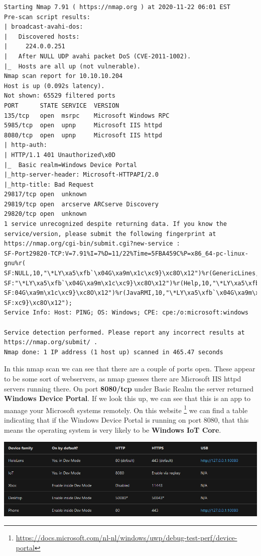\documentclass[../main.tex]{subfiles}
\begin{document}
\begin{lstlisting}
Starting Nmap 7.91 ( https://nmap.org ) at 2020-11-22 06:01 EST
Pre-scan script results:
| broadcast-avahi-dos: 
|   Discovered hosts:
|     224.0.0.251
|   After NULL UDP avahi packet DoS (CVE-2011-1002).
|_  Hosts are all up (not vulnerable).
Nmap scan report for 10.10.10.204
Host is up (0.092s latency).
Not shown: 65529 filtered ports
PORT      STATE SERVICE  VERSION
135/tcp   open  msrpc    Microsoft Windows RPC
5985/tcp  open  upnp     Microsoft IIS httpd
8080/tcp  open  upnp     Microsoft IIS httpd
| http-auth: 
| HTTP/1.1 401 Unauthorized\x0D
|_  Basic realm=Windows Device Portal
|_http-server-header: Microsoft-HTTPAPI/2.0
|_http-title: Bad Request
29817/tcp open  unknown
29819/tcp open  arcserve ARCserve Discovery
29820/tcp open  unknown
1 service unrecognized despite returning data. If you know the
service/version, please submit the following fingerprint at 
https://nmap.org/cgi-bin/submit.cgi?new-service :
SF-Port29820-TCP:V=7.91%I=7%D=11/22%Time=5FBA459C%P=x86_64-pc-linux-gnu%r(
SF:NULL,10,"\*LY\xa5\xfb`\x04G\xa9m\x1c\xc9}\xc8O\x12")%r(GenericLines,10,
SF:"\*LY\xa5\xfb`\x04G\xa9m\x1c\xc9}\xc8O\x12")%r(Help,10,"\*LY\xa5\xfb`\x
SF:04G\xa9m\x1c\xc9}\xc8O\x12")%r(JavaRMI,10,"\*LY\xa5\xfb`\x04G\xa9m\x1c\
SF:xc9}\xc8O\x12");
Service Info: Host: PING; OS: Windows; CPE: cpe:/o:microsoft:windows

Service detection performed. Please report any incorrect results at
https://nmap.org/submit/ .
Nmap done: 1 IP address (1 host up) scanned in 465.47 seconds
\end{lstlisting}

In this nmap scan we can see that there are a couple of ports open. These appear to be some sort of webservers, as nmap guesses there are Microsoft IIS httpd servers running there. On port \textbf{8080/tcp} under Basic Realm the server returned \textbf{Windows Device Portal}. If we look this up, we can see that this is an app to manage your Microsoft systems remotely. On this website \footnote{\url{https://docs.microsoft.com/nl-nl/windows/uwp/debug-test-perf/device-portal}} we can find a table indicating that if the Windows Device Portal is running on port 8080, that this means the operating system is very likely to be \textbf{Windows IoT Core}.

\newpage
\includegraphics[width=\linewidth]{images/Wannes/omni_ports.png}
\end{document}
